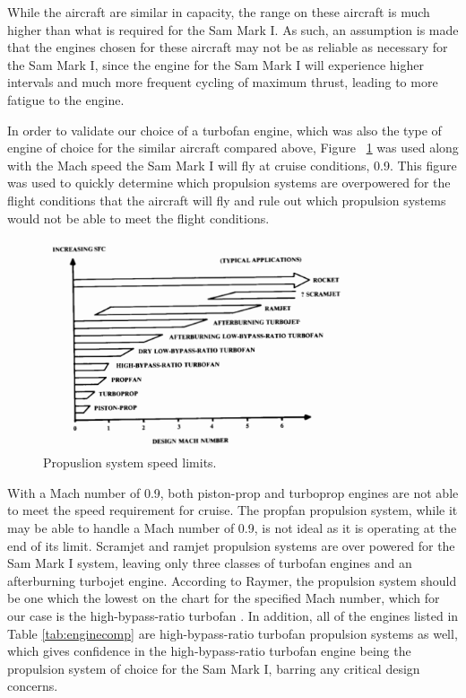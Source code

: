 While the aircraft are similar in capacity, the range on these aircraft is much higher than what is required for the Sam Mark I. As such, an assumption is made that the engines chosen for these aircraft may not be as reliable as necessary for the Sam Mark I, since the engine for the Sam Mark I will experience higher intervals and much more frequent cycling of maximum thrust, leading to more fatigue to the engine. 

In order to validate our choice of a turbofan engine, which was also the type of engine of choice for the similar aircraft compared above, Figure ~\ref{PropSelection} was used along with the Mach speed the Sam Mark I will fly at cruise conditions, 0.9. This figure was used to quickly determine which propulsion systems are overpowered for the flight conditions that the aircraft will fly and rule out which propulsion systems would not be able to meet the flight conditions.

\begin{figure} [h!]
    \centering
    \includegraphics[width=0.8\textwidth]{Photos/PropSelection.PNG}
    \caption{Propuslion system speed limits. \cite{raymer}}
    \label{PropSelection}
\end{figure}

\newpage
With a Mach number of 0.9, both piston-prop and turboprop engines are not able to meet the speed requirement for cruise. The propfan propulsion system, while it may be able to handle a Mach number of 0.9, is not ideal as it is operating at the end of its limit. Scramjet and ramjet propulsion systems are over powered for the Sam Mark I system, leaving only three classes of turbofan engines and an afterburning turbojet engine. According to Raymer, the propulsion system should be one which the lowest on the chart for the specified Mach number, which for our case is the high-bypass-ratio turbofan \cite{raymer}. In addition, all of the engines listed in Table \ref{tab:enginecomp} are high-bypass-ratio turbofan propulsion systems as well, which gives confidence in the high-bypass-ratio turbofan engine being the propulsion system of choice for the Sam Mark I, barring any critical design concerns.


